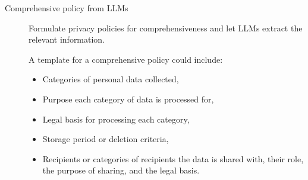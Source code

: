 \begin{description}
    \item[Comprehensive policy from LLMs] 
        Formulate privacy policies for comprehensiveness and let LLMs extract the relevant information.

        A template for a comprehensive policy could include:
        \begin{itemize}
            \item Categories of personal data collected,
            \item Purpose each category of data is processed for,
            \item Legal basis for processing each category,
            \item Storage period or deletion criteria,
            \item Recipients or categories of recipients the data is shared with, their role, the purpose of sharing, and the legal basis.
        \end{itemize}
\end{description}


